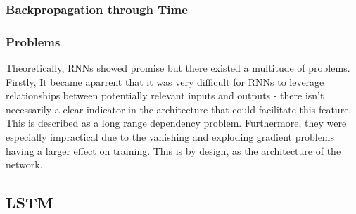 \documentclass[12pt,twoside]{report}
\begin{document}
\subsubsection{Backpropagation through Time}


\subsubsection{Problems}

Theoretically, RNNs showed promise but there existed a multitude of problems. Firstly, It became aparrent that it was very difficult for RNNs to leverage relationships between potentially relevant inputs and outputs - there isn't necessarily a clear indicator in the architecture that could facilitate this feature. This is described as a long range dependency problem. Furthermore, they were especially impractical due to the vanishing and exploding gradient problems having a larger effect on training. This is by design, as the architecture of the network.

\subsection{LSTM}
\end{document}
